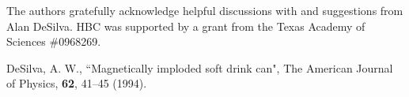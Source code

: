 \documentclass[prb,preprint]{revtex4-1}
\begin{document}
\begin{acknowledgments}
The authors gratefully acknowledge helpful discussions with and suggestions from Alan DeSilva.  HBC was supported by a grant from the Texas Academy of Sciences \#0968269.\end{acknowledgments}

\begin{thebibliography}{99}

 DeSilva, A. W., ``Magnetically imploded soft drink can", The American Journal of Physics, \textbf{62}, 41--45 (1994).  



\end{thebibliography}



\end{document}
